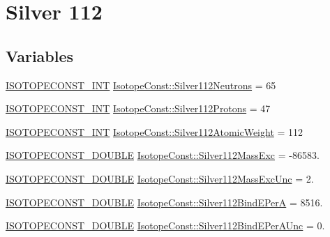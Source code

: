 \hypertarget{group___isotope_const-_silver-_ag112}{}\section{Silver 112}
\label{group___isotope_const-_silver-_ag112}
\subsection*{Variables}
\begin{DoxyCompactItemize}
\item 
\mbox{\hyperlink{group___isotope_const-_macros_ga5f18360b3e99483a35c32d789e62621c}{I\+S\+O\+T\+O\+P\+E\+C\+O\+N\+S\+T\+\_\+\+I\+NT}} \mbox{\hyperlink{group___isotope_const-_silver-_ag112_ga7df960702ffc436222f25fe59a3cc36d}{Isotope\+Const\+::\+Silver112\+Neutrons}} = 65
\item 
\mbox{\hyperlink{group___isotope_const-_macros_ga5f18360b3e99483a35c32d789e62621c}{I\+S\+O\+T\+O\+P\+E\+C\+O\+N\+S\+T\+\_\+\+I\+NT}} \mbox{\hyperlink{group___isotope_const-_silver-_ag112_ga0dce6e806a3b0682fa5895f05644b3be}{Isotope\+Const\+::\+Silver112\+Protons}} = 47
\item 
\mbox{\hyperlink{group___isotope_const-_macros_ga5f18360b3e99483a35c32d789e62621c}{I\+S\+O\+T\+O\+P\+E\+C\+O\+N\+S\+T\+\_\+\+I\+NT}} \mbox{\hyperlink{group___isotope_const-_silver-_ag112_gada1bbebef650de5857e26775cda9c76e}{Isotope\+Const\+::\+Silver112\+Atomic\+Weight}} = 112
\item 
\mbox{\hyperlink{group___isotope_const-_macros_ga8f45a7272ce02c0b4c65c44636ed719a}{I\+S\+O\+T\+O\+P\+E\+C\+O\+N\+S\+T\+\_\+\+D\+O\+U\+B\+LE}} \mbox{\hyperlink{group___isotope_const-_silver-_ag112_ga4e94f7e31bedc99e92867548ae04879c}{Isotope\+Const\+::\+Silver112\+Mass\+Exc}} = -\/86583.
\item 
\mbox{\hyperlink{group___isotope_const-_macros_ga8f45a7272ce02c0b4c65c44636ed719a}{I\+S\+O\+T\+O\+P\+E\+C\+O\+N\+S\+T\+\_\+\+D\+O\+U\+B\+LE}} \mbox{\hyperlink{group___isotope_const-_silver-_ag112_gac12f043367052858f8255f2e84316b50}{Isotope\+Const\+::\+Silver112\+Mass\+Exc\+Unc}} = 2.
\item 
\mbox{\hyperlink{group___isotope_const-_macros_ga8f45a7272ce02c0b4c65c44636ed719a}{I\+S\+O\+T\+O\+P\+E\+C\+O\+N\+S\+T\+\_\+\+D\+O\+U\+B\+LE}} \mbox{\hyperlink{group___isotope_const-_silver-_ag112_gadb714ee974b1c1e53df7749f53f3fd1c}{Isotope\+Const\+::\+Silver112\+Bind\+E\+PerA}} = 8516.
\item 
\mbox{\hyperlink{group___isotope_const-_macros_ga8f45a7272ce02c0b4c65c44636ed719a}{I\+S\+O\+T\+O\+P\+E\+C\+O\+N\+S\+T\+\_\+\+D\+O\+U\+B\+LE}} \mbox{\hyperlink{group___isotope_const-_silver-_ag112_gaad30795a3e9fc4666faedb0d3e5caf4d}{Isotope\+Const\+::\+Silver112\+Bind\+E\+Per\+A\+Unc}} = 0.

\end{DoxyCompactItemize}
